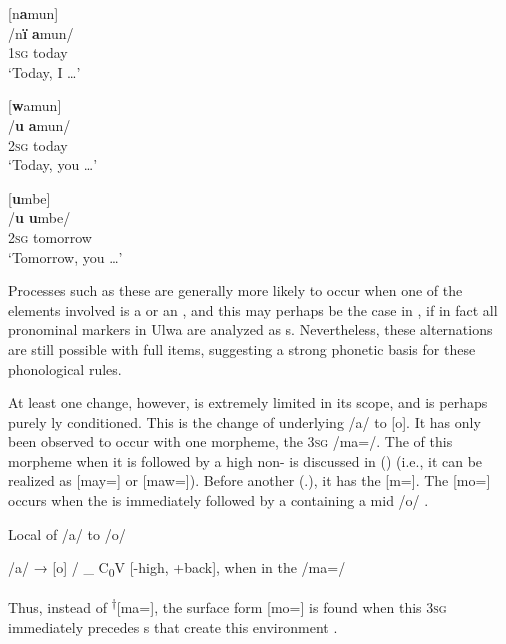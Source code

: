     \ea  {}[n\textbf{a}mun]\\
      \gll \normalfont/n\textbf{ï}    \normalfont\textbf{a}mun/\\
      1\textsc{sg}  today\\
      \glt ‘Today, I …’

    \ex  {}[\textbf{w}amun]\\
      \gll \normalfont/\textbf{u}    \normalfont\textbf{a}mun/\\
      2\textsc{sg}  today\\
      \glt ‘Today, you …’

    \ex  {}[\textbf{u}mbe]\\
      \gll \normalfont/\textbf{u}    \normalfont\textbf{u}mbe/\\
      2\textsc{sg}  tomorrow\\
      \glt ‘Tomorrow, you …’
      \z
\z

Processes such as these are generally more likely to occur when one of the elements involved is a  or an , and this may perhaps be the case in , if in fact all pronominal markers in Ulwa are analyzed as s. Nevertheless, these alternations are still possible with full  items, suggesting a strong phonetic basis for these phonological rules.

  At least one change, however, is extremely limited in its scope, and is perhaps purely ly conditioned. This is the change of underlying /a/ to [o]. It has only been observed to occur with one morpheme, the 3\textsc{sg}  /ma=/. The  of this morpheme when it is followed by a high non- is discussed in () (i.e., it can be realized as [may=] or [maw=]). Before another  (.), it has the  [m=]. The  [mo=] occurs when the  is immediately followed by a  containing a mid  /o/ .

\ea%
    \label{ex:phon:82}
          Local   of /a/ to /o/

    /a/ → [o] / \_ C\textsubscript{0}V [-high, +back], when in the  /ma=/
\z

Thus, instead of \textsuperscript{†}[ma=], the surface form [mo=] is found when this 3\textsc{sg}  immediately precedes s that create this environment .

